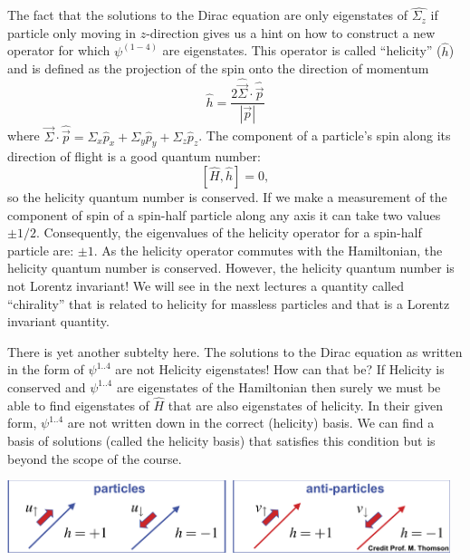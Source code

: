 The fact that the solutions to the Dirac equation are only eigenstates of $\hat{\Sigma_z}$ if
particle only moving in $z$-direction gives us a hint on how to construct a new operator
for which $\psi^{(1-4)}$ are eigenstates. This operator is called ``helicity'' ($\hat{h}$) and
is defined as the projection of the spin onto the direction of momentum
\[
\hat{h} = \frac{2\hat{\vec{\Sigma}}\cdot\hat{\vec{p}}}{|\vec{p}|}
\]
where $\vec{\Sigma}\cdot\hat{\vec{p}}= \Sigma_x\hat{p}_x+\Sigma_y\hat{p}_y+\Sigma_z\hat{p}_z$. 
The component of a particle's spin along its direction of flight is a good quantum number:
\[
[\hat{H},\hat{h}]=0,
\]
so the helicity quantum number is conserved. If we make a measurement of the component of spin
of a spin-half particle along any axis it can take two values $\pm 1/2$. Consequently, the eigenvalues
of the helicity operator for a spin-half particle are: $\pm 1$. As the helicity operator commutes
with the Hamiltonian, the helicity quantum number is conserved. However, the helicity quantum number
is not Lorentz invariant! We will see in the next lectures a quantity called ``chirality'' that is related
to helicity for massless particles and that is a Lorentz invariant quantity.

There is yet another subtelty here. The solutions to the Dirac equation as written in the form
of $\psi^{1..4}$ are not Helicity eigenstates! How can that be? If Helicity is conserved and $\psi^{1..4}$
are eigenstates of the Hamiltonian then surely we must be able to find eigenstates of $\hat{H}$ that
are also eigenstates of helicity. In their given form, $\psi^{1..4}$ are not written down in the correct
(helicity) basis. We can find a basis of solutions (called the helicity basis) that satisfies this condition
but is beyond the scope of the course.

\begin{center}
\includegraphics[width=0.97\textwidth]{fig/helicity.png}
\end{center}
